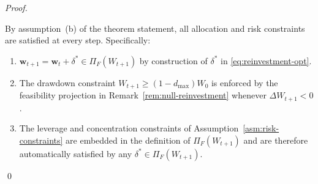 \documentclass[12pt,openany]{book}
\newcommand{\bfw}{\mathbf{w}}
\numberwithin{equation}{chapter}
\theoremstyle{plain}
\theoremstyle{definition}
\theoremstyle{remark}
\numberwithin{equation}{chapter}
\theoremstyle{plain}
\begin{document}
\begin{proof}
\begin{enumerate}
        By assumption~(b) of the theorem statement, all allocation
        and risk constraints are satisfied at every step.
        Specifically:
        \begin{enumerate}
          \item[\textup{(10a)}] $\bfw_{t+1} = \bfw_t + \delta^*
                \in \Pi_F(W_{t+1})$ by construction of $\delta^*$
                in \eqref{eq:reinvestment-opt}.
          \item[\textup{(10b)}] The drawdown constraint
                $W_{t+1} \geq (1 - d_{\max}) W_0$ is enforced
                by the feasibility projection in
                Remark~\ref{rem:null-reinvestment} whenever
                $\Delta W_{t+1} < 0$.
          \item[\textup{(10c)}] The leverage and concentration
                constraints of Assumption~\ref{asm:risk-constraints}
                are embedded in the definition of $\Pi_F(W_{t+1})$
                and are therefore automatically satisfied by any
                $\delta^* \in \Pi_F(W_{t+1})$.
        \end{enumerate}

\end{enumerate}
\qed
\end{proof}
\end{document}
